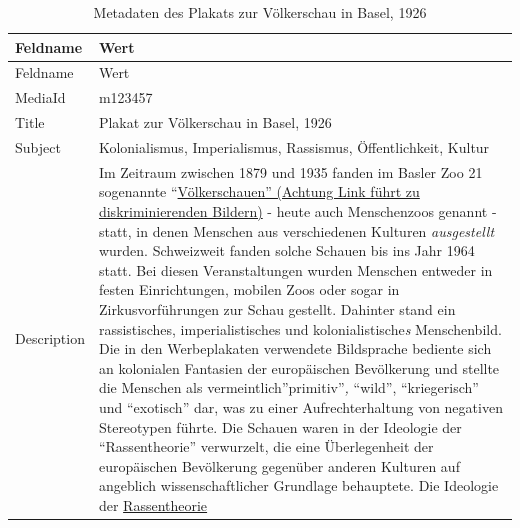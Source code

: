 \documentclass[
  letterpaper,
  DIV=11,
  numbers=noendperiod]{scrartcl}
\begin{document}
\begin{longtable}[]{@{}
  >{\raggedright\arraybackslash}p{}
  >{\raggedright\arraybackslash}p{}@{}}
\caption{Metadaten des Plakats zur Völkerschau in Basel,
1926}\label{tbl-metadaten-plakat-zur-voelkerschau-in-basel-1926}\tabularnewline
\toprule\noalign{}
\begin{minipage}[b]{\linewidth}\raggedright
Feldname
\end{minipage} & \begin{minipage}[b]{\linewidth}\raggedright
Wert
\end{minipage} \\
\midrule\noalign{}
\endfirsthead
\toprule\noalign{}
\begin{minipage}[b]{\linewidth}\raggedright
Feldname
\end{minipage} & \begin{minipage}[b]{\linewidth}\raggedright
Wert
\end{minipage} \\
\midrule\noalign{}
\endhead
\bottomrule\noalign{}
\endlastfoot
MediaId & m123457 \\
Title & Plakat zur Völkerschau in Basel, 1926 \\
Subject & Kolonialismus, Imperialismus, Rassismus, Öffentlichkeit,
Kultur \\
Description & Im Zeitraum zwischen 1879 und 1935 fanden im Basler Zoo 21
sogenannte
``\href{https://www.baslerstadtbuch.ch/stadtbuch/1992/1992_2247.html}{Völkerschauen''
(Achtung Link führt zu diskriminierenden Bildern)} - heute auch
Menschenzoos genannt - statt, in denen Menschen aus verschiedenen
Kulturen \emph{ausgestellt} wurden. Schweizweit fanden solche Schauen
bis ins Jahr 1964 statt. Bei diesen Veranstaltungen wurden Menschen
entweder in festen Einrichtungen, mobilen Zoos oder sogar in
Zirkusvorführungen zur Schau gestellt. Dahinter stand ein rassistisches,
imperialistisches und kolonialistische\emph{s} Menschenbild. Die in den
Werbeplakaten verwendete Bildsprache bediente sich an kolonialen
Fantasien der europäischen Bevölkerung und stellte die Menschen als
vermeintlich''primitiv''\emph{,} ``wild'', ``kriegerisch'' und
``exotisch'' dar, was zu einer Aufrechterhaltung von negativen
Stereotypen führte. Die Schauen waren in der Ideologie der
``Rassentheorie'' verwurzelt, die eine Überlegenheit der europäischen
Bevölkerung gegenüber anderen Kulturen auf angeblich wissenschaftlicher
Grundlage behauptete. Die Ideologie der
\href{https://hls-dhs-dss.ch/de/articles/060537/2024-04-08/}{Rassentheorie}

\end{longtable}
\end{document}
